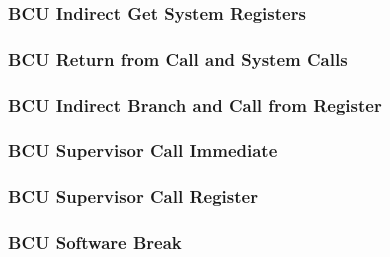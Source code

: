 \subsubsection[{\small BCU Indirect Get System Registers}]{BCU Indirect Get System Registers} \label{sec:format-BCU-IGSR}



\subsubsection[{\small BCU Return from Call and System Calls}]{BCU Return from Call and System Calls} \label{sec:format-BCU-RTS}



\subsubsection[{\small BCU Indirect Branch and Call from Register}]{BCU Indirect Branch and Call from Register} \label{sec:format-BCU-IBC}



\subsubsection[{\small BCU Supervisor Call Immediate}]{BCU Supervisor Call Immediate} \label{sec:format-BCU-SCI}



\subsubsection[{\small BCU Supervisor Call Register}]{BCU Supervisor Call Register} \label{sec:format-BCU-SCR}



\subsubsection[{\small BCU Software Break}]{BCU Software Break} \label{sec:format-BCU-BREAK}

